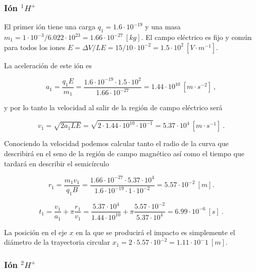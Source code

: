 \documentclass[journal]{IEEEtran}
\begin{document}
\subsubsection{Ión $^1H^+$}

El primer ión tiene una carga $q_1 = 1.6\cdot 10^{-19}$ y una masa $m_1 = 1\cdot 10^{-3} / 6.022\cdot 10^{23} = 1.66\cdot 10^{-27}~[kg]$. El campo eléctrico es fijo y común para todos los iones $E = \Delta V / LE = 15 / 10\cdot 10^{-2} = 1.5\cdot 10^2~[V\cdot m^{-1}]$.

La aceleración de este ión es

\begin{equation}
a_1 = \displaystyle\frac{q_1E}{m_1} = \displaystyle\frac{1.6\cdot 10^{-19}\cdot 1.5\cdot 10^{2}}{1.66\cdot 10^{-27}} = 1.44 \cdot 10^{10}~[m\cdot s^{-2}]~,
\end{equation}

y por lo tanto la velocidad al salir de la región de campo eléctrico será

\begin{equation}
    v_1 = \sqrt{2a_1LE} = \sqrt{2\cdot 1.44\cdot 10^{10} \cdot 10^{-1}} = 5.37 \cdot 10^4~[m\cdot s^{-1}]~.
\end{equation}

Conociendo la velocidad podemos calcular tanto el radio de la curva que describirá en el seno de la región de campo magnético así como el tiempo que tardará en describir el semicírculo

\begin{equation}
r_1 = \displaystyle\frac{m_1v_1}{q_1B} = \displaystyle\frac{1.66\cdot 10^{-27} \cdot 5.37\cdot 10^4}{1.6\cdot 10^{-19}\cdot 1 \cdot 10^{-2}} = 5.57 \cdot 10^{-2}~[m].
\end{equation}

\begin{equation}
t_1 = \displaystyle\frac{v_1}{a_1} + \pi \displaystyle\frac{r_1}{v_1} = \displaystyle\frac{5.37 \cdot 10^4}{1.44 \cdot 10^{10}} + \pi \displaystyle\frac{5.57 \cdot 10^{-2}}{5.37 \cdot 10^4} = 6.99 \cdot 10^{-6}~[s]~.
\end{equation}

La posición en el eje $x$ en la que se producirá el impacto es simplemente el diámetro de la trayectoria circular $x_1 = 2\cdot5.57 \cdot 10^{-2} = 1.11 \cdot 10^-1~[m]$.

\subsubsection{Ión $^2H^+$}
\end{document}
